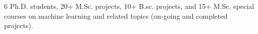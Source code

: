 \documentclass[10pt]{article}
\newcommand{\halfblankline}{\quad\vspace{-0.5\baselineskip}\pagebreak[3]}
\begin{document}
6 Ph.D. students,  20+ M.Sc. projects, 10+ B.sc. projects, and 15+ M.Sc. special courses on machine learning and related topics (on-going and completed projects).

%
%
%
%            
%
%        
%
%
%
%









\end{document}
